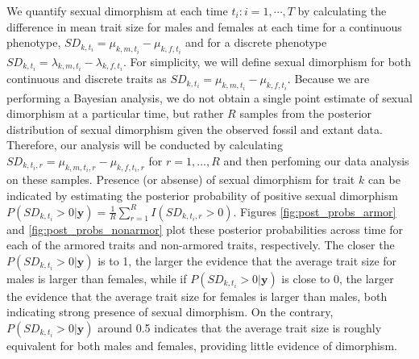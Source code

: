 \documentclass[
  12pt,
]{article}
\begin{document}
We quantify sexual dimorphism at each time \(t_i: i = 1,\cdots,T\) by
calculating the difference in mean trait size for males and females at
each time for a continuous phenotype,
\(SD_{k,t_i} = \mu_{k,m,t_i} - \mu_{k,f,t_i}\) and for a discrete
phenotype \(SD_{k,t_i} = \lambda_{k,m,t_i} - \lambda_{k,f,t_i}\). For
simplicity, we will define sexual dimorphism for both continuous and
discrete traits as \(SD_{k,t_i} = \mu_{k,m,t_i} - \mu_{k,f,t_i}\).
Because we are performing a Bayesian analysis, we do not obtain a single
point estimate of sexual dimorphism at a particular time, but rather
\(R\) samples from the posterior distribution of sexual dimorphism given
the observed fossil and extant data. Therefore, our analysis will be
conducted by calculating
\(SD_{k,t_i,r} = \mu_{k,m,t_i,r} - \mu_{k,f,t_i,r}\) for
\(r = 1,\dots,R\) and then perfoming our data analysis on these samples.
Presence (or absense) of sexual dimorphism for trait \(k\) can be
indicated by estimating the posterior probability of positive sexual
dimorphism
\(P(SD_{k,t_i} > 0 | \boldsymbol{y}) = \frac{1}{R} \sum_{r=1}^R I(SD_{k,t_i,r} > 0)\).
Figures \ref{fig:post_probs_armor} and \ref{fig:post_probs_nonarmor}
plot these posterior probabilities across time for each of the armored
traits and non-armored traits, respectively. The closer the
\(P(SD_{k,t_i} > 0 | \boldsymbol{y})\) is to 1, the larger the evidence
that the average trait size for males is larger than females, while if
\(P(SD_{k,t_i} > 0 | \boldsymbol{y})\) is close to 0, the larger the
evidence that the average trait size for females is larger than males,
both indicating strong presence of sexual dimorphism. On the contrary,
\(P(SD_{k,t_i} > 0 | \boldsymbol{y})\) around 0.5 indicates that the
average trait size is roughly equivalent for both males and females,
providing little evidence of dimorphism.
\end{document}
